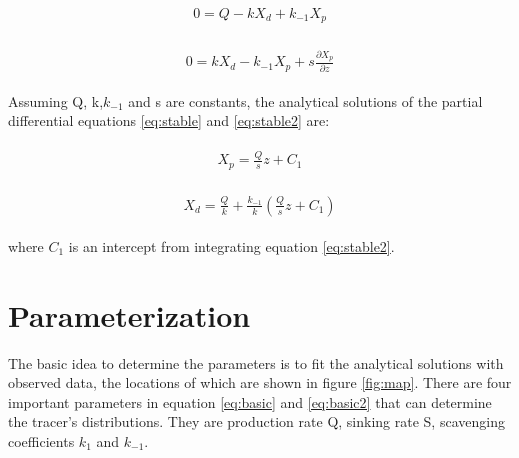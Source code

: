 \documentclass[paper=a4, fontsize=11pt]{scrartcl} %
\numberwithin{equation}{section} %
\numberwithin{figure}{section} %
\numberwithin{table}{section} %
\begin{document}
\begin{align}
\label{eq:stable}
\begin{split}
0= Q-kX_{d}+k_{-1}X_{p}
\end{split}
\end{align}

\begin{align}
\label{eq:stable2}
\begin{split}
0 = kX_{d}-k_{-1}X_{p}+s\frac{\partial X_{p}}{\partial z}
\end{split}
\end{align}

Assuming Q, k,$k_{-1}$ and s are constants, the analytical solutions of the partial differential equations \ref{eq:stable} and \ref{eq:stable2} are:

\begin{align}
\label{eq:sol}
\begin{split}
X_{p} = \frac{Q}{s}z+C_{1}
\end{split}
\end{align}

\begin{align}
\label{eq:sol2}
\begin{split}
X_{d} = \frac{Q}{k} + \frac {k_{-1}}{k}\left( \frac{Q}{s}z+C_{1}\right)
\end{split}
\end{align}

where $ C_{1}$ is an intercept from integrating equation \ref{eq:stable2}.

\section{Parameterization}

The basic idea to determine the parameters is to fit the analytical solutions with observed data, the locations of which are shown in figure \ref{fig:map}. There are four important parameters in equation \ref{eq:basic} and \ref{eq:basic2} that can determine the tracer's distributions. They are production rate Q, sinking rate S, scavenging coefficients ${k_{1}}$ and $k_{-1}$.
\end{document}
